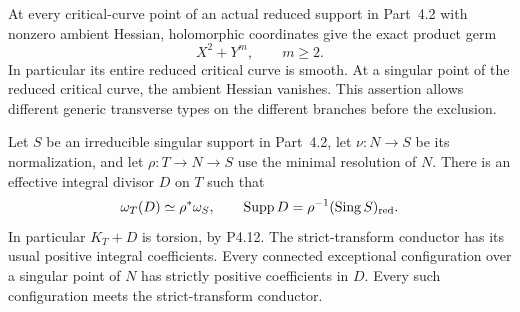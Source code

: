 \begin{proposition}[P4R.15]\hypertarget{tag-02Y8}{}\label{night:P4R.15}\label{stmt:P4R.15}


At every critical-curve point of an actual reduced support in
Part~4.2 with nonzero ambient Hessian, holomorphic coordinates
give the exact product germ
\[
                       X^2+Y^m,\qquad m\ge2.
\]
In particular its entire reduced critical curve is smooth.
At a singular point of the reduced critical curve, the ambient
Hessian vanishes. This assertion allows different generic
transverse types on the different branches before the exclusion.
\end{proposition}

\begin{proposition}[P4R.6]\hypertarget{tag-02YI}{}\label{night:P4R.6}\label{stmt:P4R.6}


Let $S$ be an irreducible singular support in
Part~4.2, let $\nu:N\to S$ be its normalization,
and let $\rho:T\to N\to S$ use the minimal
resolution of $N$. There is an effective integral
divisor $D$ on $T$ such that
\[
 \omega_T(D)\simeq\rho^*\omega_S,
 \qquad \operatorname{Supp}D
       =\rho^{-1}(\operatorname{Sing}S)_{\rm red}.
\]
In particular $K_T+D$ is torsion, by P4.12.
The strict-transform conductor has its usual
positive integral coefficients. Every connected
exceptional configuration over a singular point
of $N$ has strictly positive coefficients in $D$.
Every such configuration meets the strict-transform
conductor.
\end{proposition}

